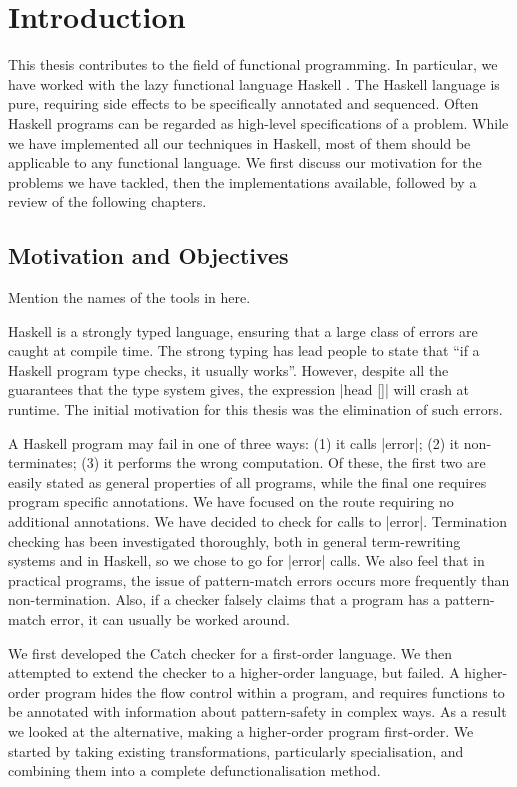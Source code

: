 
\chapter{Introduction}

This thesis contributes to the field of functional programming. In particular, we have worked with the lazy functional language Haskell \cite{haskell}. The Haskell language is pure, requiring side effects to be specifically annotated and sequenced. Often Haskell programs can be regarded as high-level specifications of a problem. While we have implemented all our techniques in Haskell, most of them should be applicable to any functional language. We first discuss our motivation for the problems we have tackled, then the implementations available, followed by a review of the following chapters.

\section{Motivation and Objectives}

Mention the names of the tools in here.

Haskell is a strongly typed language, ensuring that a large class of errors are caught at compile time. The strong typing has lead people to state that ``if a Haskell program type checks, it usually works''. However, despite all the guarantees that the type system gives, the expression |head []| will crash at runtime. The initial motivation for this thesis was the elimination of such errors.

A Haskell program may fail in one of three ways: (1) it calls |error|; (2) it non-terminates; (3) it performs the wrong computation. Of these, the first two are easily stated as general properties of all programs, while the final one requires program specific annotations. We have focused on the route requiring no additional annotations. We have decided to check for calls to |error|. Termination checking has been investigated thoroughly, both in general term-rewriting systems and in Haskell, so we chose to go for |error| calls. We also feel that in practical programs, the issue of pattern-match errors occurs more frequently than non-termination. Also, if a checker falsely claims that a program has a pattern-match error, it can usually be worked around.

We first developed the Catch checker for a first-order language. We then attempted to extend the checker to a higher-order language, but failed. A higher-order program hides the flow control within a program, and requires functions to be annotated with information about pattern-safety in complex ways. As a result we looked at the alternative, making a higher-order program first-order. We started by taking existing transformations, particularly specialisation, and combining them into a complete defunctionalisation method.

